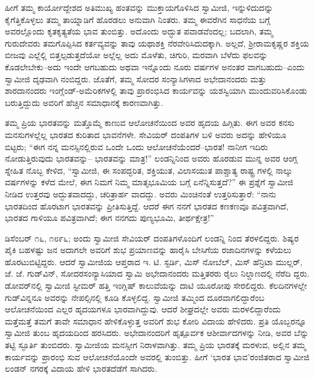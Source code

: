 ಹೀಗೆ ತಮ್ಮ ಕಾರ್ಯೋದ್ದೇಶದ ಅತಿಮುಖ್ಯ ಹಂತವನ್ನು ಮುಕ್ತಾಯಗೊಳಿಸಿದ ಸ್ವಾಮೀಜಿ, ಇನ್ನುಳಿದುದನ್ನು ಕೈಗೆತ್ತಿಕೊಳ್ಳಲು ತಮ್ಮ ತಾಯ್ನಾಡಿಗೆ ಹೊರಡಲು ಅನುವಾಗಿ ನಿಂತರು. ತಮ್ಮ ಈವರೆಗಿನ ಸಾಧನೆಯ ಬಗ್ಗೆ ಅವರಲ್ಲೊಂದು ಕೃತಕೃತ್ಯತೆಯ ಭಾವ ತುಂಬಿತ್ತು. ಅದೊಂದು ಅದ್ಭುತ ಪವಾಡವೆಂದಲ್ಲ; ಬದಲಾಗಿ, ತಮ್ಮ ಗುರುದೇವರು ತಮಗೊಪ್ಪಿಸಿದ ಕರ್ತವ್ಯವನ್ನು ತಾವು ಯಥಾಶಕ್ತಿ ನೆರವೇರಿಸಿದುದಕ್ಕಾಗಿ. ಅಲ್ಲದೆ, ಶ್ರೀರಾಮಕೃಷ್ಣರ ಶಕ್ತಿಯ ಬೀಜವು ಎಲ್ಲೆಲ್ಲಿ ಬಿತ್ತಲ್ಪಡುತ್ತದೆಯೋ ಅಲ್ಲೆಲ್ಲ ಅದು ಮೊಳೆತು, ಚಿಗುರಿ, ಮರವಾಗಿ ಬೆಳೆದು ಫಲವನ್ನು ಕೊಡಲೇಬೇಕು–ಅದು ಇಂದೇ ಆಗಬಹುದು ಅಥವಾ ಇನ್ನೊಂದು ನೂರು ವರ್ಷಗಳ ಅನಂತರ ವಾಗಬಹುದು–ಎಂದು ಸ್ವಾಮೀಜಿ ದೃಢವಾಗಿ ನಂಬಿದ್ದರು. ಜೊತೆಗೆ, ತಮ್ಮ ಸೋದರ ಸಂನ್ಯಾಸಿಗಳಾದ ಅಭೇದಾನಂದರು ಮತ್ತು ಶಾರದಾನಂದರು ಇಂಗ್ಲೆಂಡ್​-ಅಮೆರಿಕಗಳಲ್ಲಿ ತಾವು ಪ್ರಾರಂಭಿಸಿದ ಕಾರ್ಯವನ್ನು ಯಶಸ್ವಿಯಾಗಿ ಮುಂದುವರಿಸಿಕೊಂಡು ಬರುತ್ತಿದ್ದುದು ಅವರಿಗೆ ಹೆಚ್ಚಿನ ಸಮಾಧಾನಕ್ಕೆ ಕಾರಣವಾಗಿತ್ತು.

ತಮ್ಮ ಪ್ರಿಯ ಭಾರತವನ್ನು ಮತ್ತೊಮ್ಮೆ ಕಾಣುವ ಆಲೋಚನೆಯಿಂದ ಅವರ ಹೃದಯ ಹಿಗ್ಗಿತು. ಈಗ ಅವರ ಕನಸು ಮನಸುಗಳಲ್ಲೆಲ್ಲ ಭಾರತದ ಕುರಿತಾದ ಭಾವನೆಗಳೇ. ಸೇವಿಯರ್ ದಂಪತಿಗಳ ಬಳಿ ಅವರು ಅದನ್ನು ಹೇಳಿಯೂ ಬಿಟ್ಟರು; “ಈಗ ನನ್ನ ಮನಸ್ಸಿನಲ್ಲಿರುವ ಒಂದೇ ಒಂದು ಆಲೋಚನೆಯೆಂದರೆ–ಭಾರತ! ನಾನೀಗ ಇದಿರು ನೋಡುತ್ತಿರುವುದು ಭಾರತವನ್ನು– ಭಾರತವನ್ನು ಮಾತ್ರ!” ಲಂಡನ್ನಿನಿಂದ ಅವರು ಹೊರಡುವ ಮುನ್ನ ಅವರ ಆಂಗ್ಲ ಸ್ನೇಹಿತ ನೊಬ್ಬ ಕೇಳಿದ, “ಸ್ವಾಮೀಜಿ, ಈ ಸಂಪದ್ಭರಿತ, ಶಕ್ತಿಯುತ, ವಿಲಾಸಯುತ ಪಾಶ್ಚಾತ್ಯ ರಾಷ್ಟ್ರ ಗಳಲ್ಲಿ ನಾಲ್ಕು ವರ್ಷಗಳನ್ನು ಕಳೆದ ಮೇಲೆ, ಈಗ ನಿಮಗೆ ನಿಮ್ಮ ಮಾತೃಭೂಮಿಯ ಬಗ್ಗೆ ಏನೆನ್ನಿಸುತ್ತದೆ?” ಈ ಪ್ರಶ್ನೆಗೆ ಸ್ವಾಮೀಜಿ ನೀಡಿದ ಉತ್ತರವು ಅದ್ಭುತವಾದದ್ದು, ಚರಿತ್ರಾರ್ಹ ವಾದದ್ದು. ಅವರು ಮಿಂಚಿನಂತೆ ಉತ್ತರಿಸುತ್ತಾರೆ: “ನಾನು ಭಾರತದಿಂದ ಹೊರಟಾಗ ಭಾರತವನ್ನು ಪ್ರೀತಿಸುತ್ತಿದ್ದೆ. ಆದರೆ ಈಗ ನನಗೆ ಭಾರತದ ಕಣಕಣವೂ ಪವಿತ್ರವಾಗಿದೆ, ಭಾರತದ ಗಾಳಿಯೂ ಪವಿತ್ರವಾಗಿದೆ; ಈಗ ನನಗದು ಪುಣ್ಯಭೂಮಿ, ತೀರ್ಥಕ್ಷೇತ್ರ!”

ಡಿಸೆಂಬರ್ ೧೬, ೧೮೯೬; ಅಂದು ಸ್ವಾಮೀಜಿ ಸೇವಿಯರ್ ದಂಪತಿಗಳೊಂದಿಗೆ ಲಂಡನ್ನಿ ನಿಂದ ತೆರಳಲಿದ್ದರು. ಶಿಷ್ಯರ ಪೈಕಿ ಬಹಳಷ್ಟು ಜನ ಅದಾಗಲೇ ಅವರಿಗೆ ಶುಭ ಪ್ರಯಾಣವನ್ನು ಹಾರೈಸಿ ಬೇಸಿಗೆಯ ರಜಾದಿನಗಳನ್ನು ಕಳೆಯಲು ಹೊರಟುಬಿಟ್ಟಿದ್ದರು. ಆದರೆ ಸ್ವಾಮೀಜಿಯ ಆಪ್ತರಾದ ಇ. ಟಿ. ಸ್ಟರ್ಡಿ, ಮಿಸ್ ನೋಬೆಲ್, ಮಿಸ್ ಹೆನ್ರಿಟಾ ಮುಲ್ಲರ್, ಜೆ. ಜೆ. ಗುಡ್​ವಿನ್, ಸೋದರಸಂನ್ಯಾಸಿಯಾದ ಸ್ವಾಮಿ ಅಭೇದಾನಂದರು ಮತ್ತಿತರರು ರೈಲು ನಿಲ್ದಾಣದಲ್ಲಿ ನೆರೆದಿ ದ್ದರು. ಡೋವರ್​ನಲ್ಲಿ ಸ್ವಾಮೀಜಿ ಸ್ಟೀಮರ್ ಹತ್ತಿ ಇಂಗ್ಲಿಷ್ ಕಾಲುವೆಯನ್ನು ದಾಟಿ ಯೂರೋಪು ಸೇರಲಿದ್ದರು. ಕೆಲದಿನಗಳಲ್ಲೇ ಗುಡ್​ವಿನ್ನನೂ ಅವರನ್ನು ನೇಪಲ್ಸಿನಲ್ಲಿ ಕೂಡಿ ಕೊಳ್ಳಲಿದ್ದ. ಸ್ವಾಮೀಜಿ ತಮ್ಮಿಂದ ದೂರವಾಗಲಿದ್ದಾರೆಂಬ ಆಲೋಚನೆಯಿಂದ ಎಲ್ಲರ ಹೃದಯಗಳೂ ಭಾರವಾಗಿದ್ದುವು. ಆದರೆ ಶೀಘ್ರದಲ್ಲೇ ಅವರು ಮರಳಲಿದ್ದಾರೆಂದು ಮತ್ತೆಮತ್ತೆ ತಮಗೆ ತಾವೇ ಸಮಾಧಾನ ಹೇಳಿಕೊಳ್ಳುತ್ತ ಅವರಿಗೆ ಶುಭ ಕೋರಿ ವಿದಾಯ ಹೇಳಿದರು. ಪ್ರತಿ ಯೊಬ್ಬರನ್ನೂ ಸ್ವಾಮೀಜಿ ತುಂಬ ಹೃದಯದಿಂದ ಹರಸಿದರು. ಅಭೇದಾನಂದರಿಗೆ ಹೃತ್ಪೂರ್ವಕ ಆಶೀರ್ವಾದಗಳನ್ನು ನೀಡಿ, ಅವರ ಬೆನ್ನು ತಟ್ಟಿ ಸ್ಫೂರ್ತಿ ತುಂಬಿದರು. ಸ್ವಾಮೀಜಿಯ ಮನಸ್ಸೀಗ ನಿರಾಳವಾಗಿತ್ತು. ತಮ್ಮ ಪ್ರಿಯ ಭಾರತಕ್ಕೆ ಮರಳುವ, ಅಲ್ಲಿನ ತಮ್ಮ ಕಾರ್ಯವನ್ನು ಪ್ರಾರಂಭಿ ಸುವ ಆಲೋಚನೆಯೊಂದೇ ಅವರಲ್ಲಿ ತುಂಬಿತ್ತು. ಹೀಗೆ ‘ಭಾರತ ಭಾವ’ರಂಜಿತರಾದ ಸ್ವಾಮೀಜಿ ಲಂಡನ್ ನಗರಕ್ಕೆ ವಿದಾಯ ಹೇಳಿ ಭಾರತದೆಡೆಗೆ ಸಾಗಿದರು.

